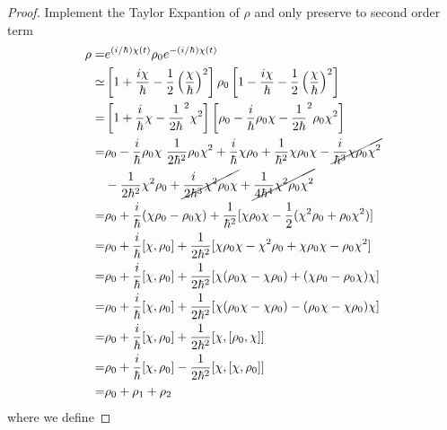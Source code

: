   \begin{proof}
    Implement the Taylor Expantion of $\rho$ and only preserve to second order term
    \begin{equation}
      \begin{aligned}
        \rho =& e^{(i/\hbar)\chi(t)}\rho_{0}e^{-(i/\hbar)\chi(t)}\\                                       \label{tdhf28}  
             \simeq & \left[ 1 + \frac{i\chi}{\hbar} - \frac{1}{2}\left(\frac{\chi}{\hbar}\right)^2 \right] \rho_0 \left[ 1 - \frac{i\chi}{\hbar} - \frac{1}{2}\left(\frac{\chi}{\hbar}\right)^2 \right] \\
             =& \left[1+\frac{i}{\hbar}\chi - \frac{1}{2\hbar}^2\chi^2 \right] \left[ \rho_0 - \frac{i}{\hbar}\rho_0\chi - \frac{1}{2\hbar}^2\rho_0\chi^2 \right] \\
             =& \rho_0 - \frac{i}{\hbar}\rho_0\chi \ \frac{1}{2\hbar^2}\rho_0\chi^2 + \frac{i}{\hbar}\chi\rho_0 + \frac{1}{\hbar^2}\chi\rho_0\chi - \cancel{\frac{i}{\hbar^3}\chi\rho_0\chi^2}\\
              &  - \frac{1}{2\hbar^2}\chi^2\rho_0 + \cancel{\frac{i}{2\hbar^3}\chi^2\rho_0\chi} + \cancel{\frac{1}{4\hbar^4}\chi^2\rho_0\chi^2}\\
             =& \rho_0 + \frac{i}{\hbar}(\chi\rho_0 - \rho_0\chi) + \frac{1}{\hbar^2}[\chi\rho_0\chi - \frac{1}{2}(\chi^2\rho_0 + \rho_0\chi^2)] \\
             =& \rho_0 + \frac{i}{\hbar}[\chi, \rho_0] + \frac{1}{2\hbar^2}[\chi\rho_0\chi - \chi^2\rho_0 + \chi\rho_0\chi - \rho_0\chi^2]\\
             =& \rho_0 + \frac{i}{\hbar}[\chi, \rho_0] + \frac{1}{2\hbar^2}[\chi(\rho_0\chi - \chi\rho_0) + (\chi\rho_0 - \rho_0\chi)\chi]\\
             =& \rho_0 + \frac{i}{\hbar}[\chi, \rho_0] + \frac{1}{2\hbar^2}[\chi(\rho_0\chi - \chi\rho_0) - (\rho_0\chi - \chi\rho_0)\chi]\\
             =& \rho_0 + \frac{i}{\hbar}[\chi, \rho_0] + \frac{1}{2\hbar^2}[\chi, [\rho_0,\chi]]\\
             =& \rho_0 + \frac{i}{\hbar}[\chi, \rho_0] - \frac{1}{2\hbar^2}[\chi, [\chi,\rho_0]]\\          
             =& \rho_0 + \rho_1 + \rho_2\\                                                                      
      \end{aligned}
    \end{equation}
    where we define

\end{proof}
